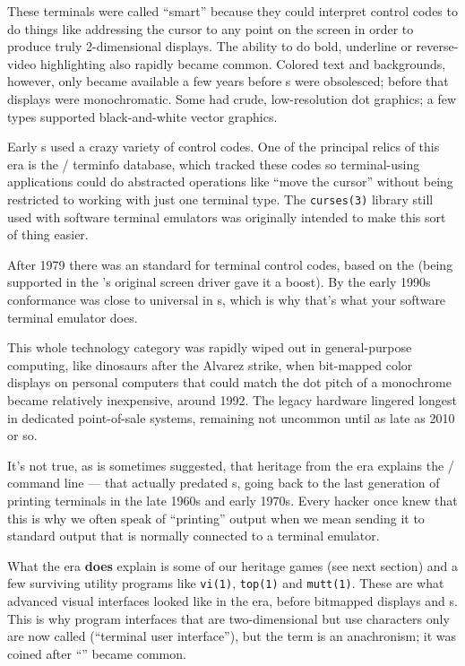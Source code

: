 These terminals were called ``smart'' because they could interpret control codes
to do things like addressing the cursor to any point on the screen in order to
produce truly 2-dimensional displays. The ability to do bold, underline or
reverse-video highlighting also rapidly became common. Colored text and
backgrounds, however, only became available a few years before s were
obsolesced; before that displays were monochromatic. Some had crude,
low-resolution dot graphics; a few types supported black-and-white vector
graphics.

Early s used a crazy variety of control codes. One of the principal relics
of this era is the \UNIX/ terminfo database, which tracked these codes so
terminal-using applications could do abstracted operations like ``move the
cursor'' without being restricted to working with just one terminal type. The
{\tt curses(3)} library still used with software terminal emulators was originally
intended to make this sort of thing easier.

After 1979 there was an  standard for terminal control codes, based on the
 (being supported in the 's original screen driver gave it a
boost). By the early 1990s  conformance was close to universal in s,
which is why that's what your software terminal emulator does.

This whole technology category was rapidly wiped out in general-purpose
computing, like dinosaurs after the Alvarez strike, when bit-mapped color
displays on personal computers that could match the dot pitch of a monochrome
 became relatively inexpensive, around 1992. The legacy  hardware
lingered longest in dedicated point-of-sale systems, remaining not uncommon
until as late as 2010 or so.

It's not true, as is sometimes suggested, that heritage from the  era
explains the \UNIX/ command line --- that actually predated s, going back to the
last generation of printing terminals in the late 1960s and early 1970s. Every
hacker once knew that this is why we often speak of ``printing'' output when we
mean sending it to standard output that is normally connected to a terminal
emulator.

What the  era {\bf does} explain is some of our heritage games (see next section)
and a few surviving utility programs like {\tt vi(1)}, {\tt top(1)} and {\tt mutt(1)}. These are
what advanced visual interfaces looked like in the  era, before bitmapped
displays and s. This is why program interfaces that are two-dimensional but
use characters only are now called  (``terminal user interface''), but the
term is an anachronism; it was coined after ``'' became common.


